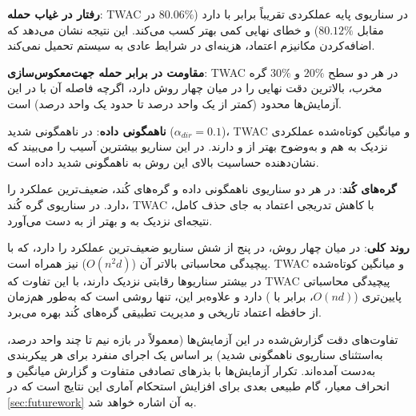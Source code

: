 \begin{itemize}
    \tick \textbf{رفتار در غیاب حمله}: \gls{TWAC} در سناریوی پایه عملکردی تقریباً برابر با  دارد ($80.06\%$ در مقابل $80.12\%$) و خطای نهایی کمی بهتر کسب می‌کند. این نتیجه نشان می‌دهد که اضافه‌کردن مکانیزم اعتماد، هزینه‌ای در شرایط عادی به سیستم تحمیل نمی‌کند.
    
    \tick \textbf{مقاومت در برابر حمله جهت‌معکوس‌سازی}: \gls{TWAC} در هر دو سطح $20\%$ و $30\%$ گره مخرب، بالاترین دقت نهایی را در میان چهار روش دارد، اگرچه فاصله آن با  در این آزمایش‌ها محدود (کمتر از یک واحد درصد تا حدود یک واحد درصد) است.
    
    \tick \textbf{ناهمگونی داده}: در ناهمگونی شدید ($\alpha_{dir}=0.1$)، \gls{TWAC} و میانگین کوتاه‌شده عملکردی نزدیک به هم و به‌وضوح بهتر از  و  دارند.  در این سناریو بیشترین آسیب را می‌بیند که نشان‌دهنده حساسیت بالای این روش به ناهمگونی شدید داده است.
    
    \tick \textbf{گره‌های کُند}:  در هر دو سناریوی ناهمگونی داده و گره‌های کُند، ضعیف‌ترین عملکرد را دارد. در سناریوی گره کُند، \gls{TWAC} با کاهش تدریجی اعتماد به جای حذف کامل، نتیجه‌ای نزدیک به  و بهتر از  به دست می‌آورد.
    
    \tick \textbf{روند کلی}: در میان چهار روش،  در پنج از شش سناریو ضعیف‌ترین عملکرد را دارد، که با پیچیدگی محاسباتی بالاتر آن ($O(n^2d)$) نیز همراه است. \gls{TWAC} و میانگین کوتاه‌شده در بیشتر سناریوها رقابتی نزدیک دارند، با این تفاوت که \gls{TWAC} پیچیدگی محاسباتی پایین‌تری ($O(nd)$، برابر با ) دارد و علاوه‌بر این، تنها روشی است که به‌طور هم‌زمان از حافظه اعتماد تاریخی و مدیریت تطبیقی گره‌های کُند بهره می‌برد.
\end{itemize}

\begin{note}
    تفاوت‌های دقت گزارش‌شده در این آزمایش‌ها (معمولاً در بازه نیم تا چند واحد درصد، به‌استثنای سناریوی ناهمگونی شدید) بر اساس یک اجرای منفرد برای هر پیکربندی به‌دست آمده‌اند. تکرار آزمایش‌ها با بذرهای تصادفی متفاوت و گزارش میانگین و انحراف معیار، گام طبیعی بعدی برای افزایش استحکام آماری این نتایج است که در \autoref{sec:futurework} به آن اشاره خواهد شد.
\end{note}
